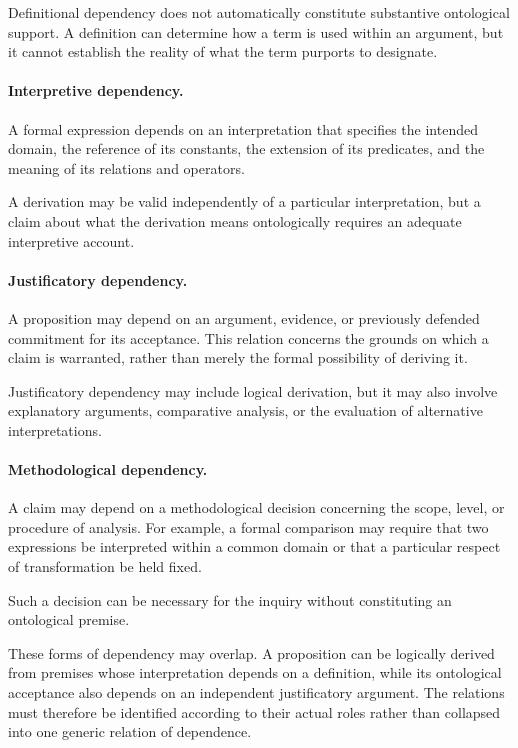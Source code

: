 Definitional dependency does not automatically constitute
substantive ontological support. A definition can determine
how a term is used within an argument, but it cannot establish
the reality of what the term purports to designate.

\paragraph{Interpretive dependency.}

A formal expression depends on an interpretation that specifies
the intended domain, the reference of its constants, the
extension of its predicates, and the meaning of its relations
and operators.

A derivation may be valid independently of a particular
interpretation, but a claim about what the derivation means
ontologically requires an adequate interpretive account.

\paragraph{Justificatory dependency.}

A proposition may depend on an argument, evidence, or previously
defended commitment for its acceptance. This relation concerns
the grounds on which a claim is warranted, rather than merely
the formal possibility of deriving it.

Justificatory dependency may include logical derivation, but it
may also involve explanatory arguments, comparative analysis,
or the evaluation of alternative interpretations.

\paragraph{Methodological dependency.}

A claim may depend on a methodological decision concerning the
scope, level, or procedure of analysis. For example, a formal
comparison may require that two expressions be interpreted
within a common domain or that a particular respect of
transformation be held fixed.

Such a decision can be necessary for the inquiry without
constituting an ontological premise.

These forms of dependency may overlap. A proposition can be
logically derived from premises whose interpretation depends
on a definition, while its ontological acceptance also depends
on an independent justificatory argument. The relations must
therefore be identified according to their actual roles rather
than collapsed into one generic relation of dependence.

